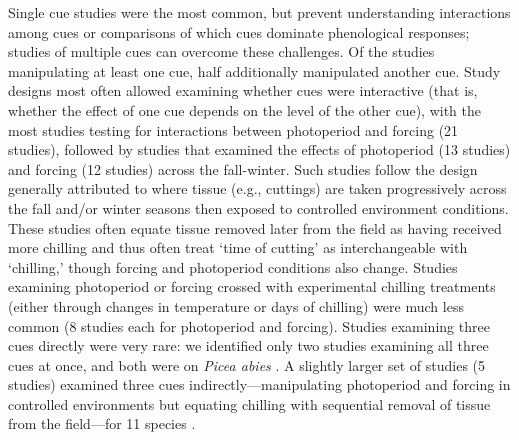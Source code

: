 \documentclass[11pt,letter]{article}
\begin{document}
Single cue studies were the most common, but prevent understanding interactions among cues or comparisons of which cues dominate phenological responses; studies of multiple cues can overcome these challenges. Of the studies manipulating at least one cue, half additionally manipulated another cue. Study designs most often allowed examining whether cues were interactive (that is, whether the effect of one cue depends on the level of the other cue), with the most studies testing for interactions between photoperiod and forcing (21 studies), followed by studies that examined the effects of photoperiod (13 studies) and forcing (12 studies) across the fall-winter. Such studies follow the design generally attributed to \citet{weinberger1950} where tissue (e.g., cuttings) are taken progressively across the fall and/or winter seasons then exposed to controlled environment conditions. These studies often equate tissue removed later from the field as having received more chilling and thus often treat `time of cutting' as interchangeable with `chilling,' though forcing and photoperiod conditions also change. Studies examining photoperiod or forcing crossed with experimental chilling treatments (either through changes in temperature or days of chilling) were much less common (8 studies each for photoperiod and forcing). Studies examining three cues directly were very rare: we identified only two studies examining all three cues at once, and both were on \emph{Picea abies} \citep{Worrall:1967aa,Sogaard:2008aa}. A slightly larger set of studies (5 studies) examined three cues indirectly---manipulating photoperiod and forcing in controlled environments but equating chilling with sequential removal of tissue from the field---for 11 species \citep{Schnabel:1987aa,Heide:1993,Partanen:1998aa,Basler:2014aa}. \\
\end{document}
